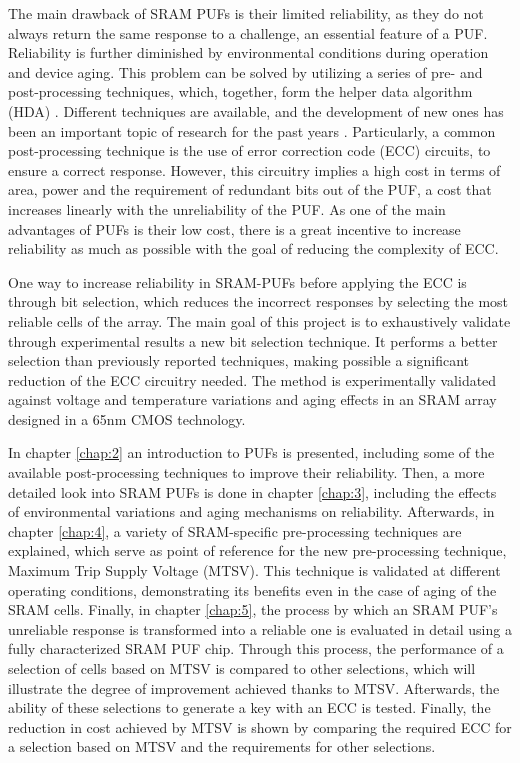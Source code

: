 The main drawback of SRAM PUFs is their limited reliability, as they do not always return the same response to a challenge, an essential feature of a PUF. Reliability is further diminished by environmental conditions during operation and device aging. This problem can be solved by utilizing a series of pre- and post-processing techniques, which, together, form the helper data algorithm (HDA) \cite{Delvaux2015}. Different techniques are available, and the development of new ones has been an important topic of research for the past years \cite{Hiller2020,Alioto2019,Shifman2018}. Particularly, a common post-processing technique is the use of error correction code (ECC) circuits, to ensure a correct response. However, this circuitry implies a high cost in terms of area, power and the requirement of redundant bits out of the PUF, a cost that increases linearly with the unreliability of the PUF. As one of the main advantages of PUFs is their low cost, there is a great incentive to increase reliability as much as possible with the goal of reducing the complexity of ECC. 

One way to increase reliability in SRAM-PUFs before applying the ECC is through bit selection, which reduces the incorrect responses by selecting the most reliable cells of the array. The main goal of this project is to exhaustively validate through experimental results a new bit selection technique. It performs a better selection than previously reported techniques, making possible a significant reduction of the ECC circuitry needed. The method is experimentally validated against voltage and temperature variations and aging effects in an SRAM array designed in a 65nm CMOS technology. 

In chapter \ref{chap:2} an introduction to PUFs is presented, including some of the available post-processing techniques to improve their reliability. Then, a more detailed look into SRAM PUFs is done in chapter \ref{chap:3}, including the effects of environmental variations and aging mechanisms on reliability. Afterwards, in chapter \ref{chap:4}, a variety of SRAM-specific pre-processing techniques are explained, which serve as point of reference for the new pre-processing technique, Maximum Trip Supply Voltage (MTSV). This technique is validated at different operating conditions, demonstrating its benefits even in the case of aging of the SRAM cells. Finally, in chapter \ref{chap:5}, the process by which an SRAM PUF's unreliable response is transformed into a reliable one is evaluated in detail using a fully characterized SRAM PUF chip. Through this process, the performance of a selection of cells based on MTSV is compared to other selections, which will illustrate the degree of improvement achieved thanks to MTSV. Afterwards, the ability of these selections to generate a key with an ECC is tested. Finally, the reduction in cost achieved by MTSV is shown by comparing the required ECC for a selection based on MTSV and the requirements for other selections. 



